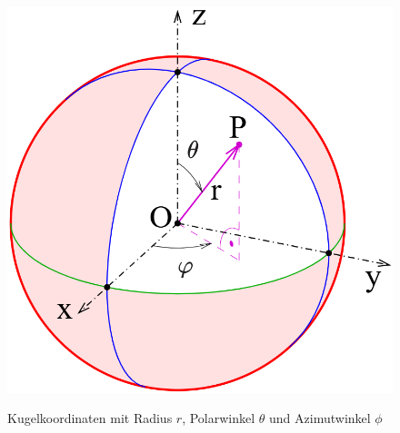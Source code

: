 \begin{figure}
	\centering
	\includegraphics[width=0.7\linewidth]{papers/geodaeten/Abbildungen/Linienelemente/LinKugel1}
	\caption{Kugelkoordinaten mit Radius $r$, Polarwinkel $\theta$ und Azimutwinkel $\phi$}
	\label{geodaeten:figure:Linienelemente:Kugelkoordinaten}
	\cite{geodaeten:Kugelkoordinaten}
\end{figure}
